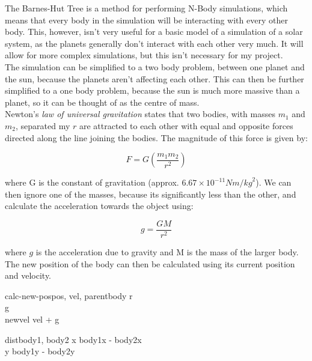 The Barnes-Hut Tree is a method for performing N-Body simulations, which means
that every body in the simulation will be interacting with every other body.
This, however, isn't very useful for a basic model of a simulation of a solar
system, as the planets generally don't interact with each other very much. It
will allow for more complex simulations, but this isn't necessary for my
project. \\

The simulation can be simplified to a two body problem, between one planet and
the sun, because the planets aren't affecting each other. This can then be
further simplified to a one body problem, because the sun is much more massive
than a planet, so it can be thought of as the centre of mass. \\

Newton's \emph{law of universal gravitation} states that two bodies, with masses
$m_1$ and $m_2$, separated my $r$ are attracted to each other with equal and
opposite forces directed along the line joining the bodies. The magnitude of
this force is given by:

\begin{equation}
	F = G (\frac{m_1 m_2}{r^2})	
\end{equation}

where G is the constant of gravitation (approx. $6.67 \times 10^{-11}
N{m/kg}^2$). We can then ignore one of the masses, because its significantly
less than the other, and calculate the acceleration towards the object using:

\begin{equation}
	g = \frac{GM}{r^2}
\end{equation}

where $g$ is the acceleration due to gravity and M is the mass of the larger
body. The new position of the body can then be calculated using its current
position and velocity.

\begin{pseudocode}{calc-new-pos}{pos, vel, parentbody}
	r \GETS {}	 \\
	g \GETS {} \\
	newvel \GETS vel + g \\
\end{pseudocode}

\begin{pseudocode}{dist}{body1, body2}
	x \GETS \lvert body1x - body2x \lvert \\
	y \GETS \lvert body1y - body2y \lvert \\
\end{pseudocode}

